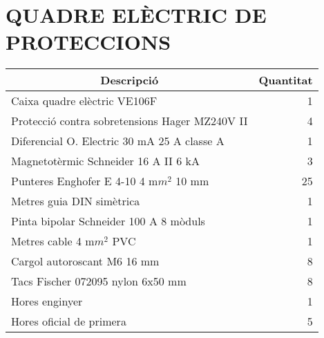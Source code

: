 \chapter{\uppercase{Quadre elèctric de proteccions}}



\begin{table}[H]
  \centering
    \begin{tabularx} {\textwidth} {|X|r|} \hline
  \multicolumn{1}{|c|}{Descripció} &  \multicolumn{1}{c|}{Quantitat}\\ \hline \hline
    Caixa quadre elèctric VE106F & 1 \\ \hline
    Protecció contra sobretensions Hager MZ240V II & 4 \\ \hline
    Diferencial O. Electric 30 mA 25 A classe A & 1 \\ \hline
    Magnetotèrmic Schneider 16 A II 6 kA & 3 \\ \hline
    Punteres Enghofer E 4-10 4 m$m^2$ 10 mm & 25 \\ \hline
    Metres guia DIN simètrica & 1 \\ \hline
    Pinta bipolar Schneider 100 A 8 mòduls & 1 \\ \hline
    Metres cable 4 m$m^2$ PVC & 1 \\ \hline
    Cargol autoroscant M6 16 mm & 8 \\ \hline
    Tacs Fischer 072095 nylon 6x50 mm & 8 \\ \hline
    Hores enginyer & 1 \\ \hline
    Hores oficial de primera & 5 \\ \hline

    \end{tabularx}%
  \label{tab:addlabel}%
\end{table}%
